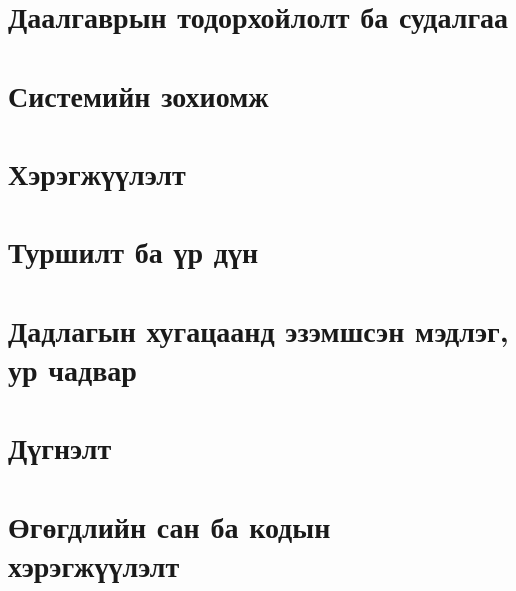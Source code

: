\documentclass[12pt,a4paper]{report}
\begin{document}
\chapter{Даалгаврын тодорхойлолт ба судалгаа}


\chapter{Системийн зохиомж}


\chapter{Хэрэгжүүлэлт}


\chapter{Туршилт ба үр дүн}


\chapter{Дадлагын хугацаанд эзэмшсэн мэдлэг, ур чадвар}


\chapter*{Дүгнэлт}


\printbibliography[heading=bibintoc, title={НОМ ЗҮЙ}]

\appendix
\chapter{Өгөгдлийн сан ба кодын хэрэгжүүлэлт}

\end{document}
